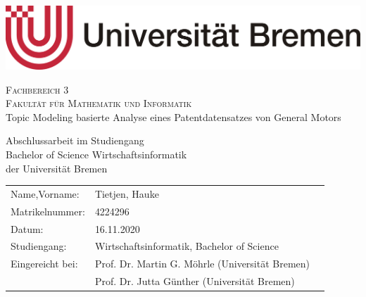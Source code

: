 \begin{titlepage}
\thispagestyle{empty}
  \begin{center}
	
  \includegraphics[scale=0.2]{img/Universitaet_Bremen}\\ \vspace{0.0cm}

	{\Large{\scshape Fachbereich 3}}\\
  {\Large{\scshape Fakultät für Mathematik und Informatik}}\\[2.5cm]
	
	{\LARGE Topic Modeling basierte Analyse eines Patentdatensatzes von General Motors}
  \vspace{2.0cm}
	  
  Abschlussarbeit im Studiengang\\
	Bachelor of Science Wirtschaftsinformatik\\
	der Universität Bremen\\[3cm]

  \begin{tabular}[c]{lll}
		Name,Vorname: & Tietjen, Hauke\\
		Matrikelnummer: & 4224296\\
		Datum: & 16.11.2020 \\
		Studiengang: & Wirtschaftsinformatik, Bachelor of Science\\
		Eingereicht bei: & Prof. Dr. Martin G. Möhrle (Universität Bremen)\\
		 & Prof. Dr. Jutta Günther (Universität Bremen)
	\end{tabular}
  \end{center}
\end{titlepage}